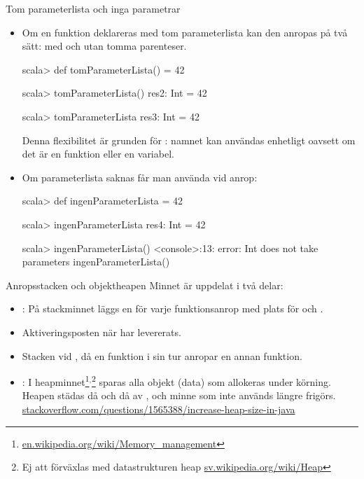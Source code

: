 \begin{Slide}{Tom parameterlista och inga parametrar}\SlideFontSmall
\begin{itemize}
\item Om en funktion deklareras med tom parameterlista \code{()} kan den anropas på två sätt: med och utan tomma parenteser.
\begin{REPL}
scala> def tomParameterLista() = 42

scala> tomParameterLista()
res2: Int = 42

scala> tomParameterLista
res3: Int = 42
\end{REPL}

Denna flexibilitet är grunden för : namnet kan användas enhetligt oavsett om det är en funktion eller en variabel.
\item Om parameterlista saknas får man  använda \code{()} vid anrop:

\begin{REPL}
scala> def ingenParameterLista = 42

scala> ingenParameterLista
res4: Int = 42

scala> ingenParameterLista()
<console>:13: error: Int does not take parameters
       ingenParameterLista()
\end{REPL}

\end{itemize}
\end{Slide}



\begin{Slide}{Anropsstacken och objektheapen}\SlideFontSmall
Minnet är uppdelat i två delar:
\begin{itemize}
\item {}: På stackminnet läggs en   för varje funktionsanrop med plats för  och .
\item Aktiveringsposten  när  har levererats.
\item Stacken  vid , då en funktion i sin tur anropar en annan funktion.

\item {}: I heapminnet\footnote{\href{https://en.wikipedia.org/wiki/Memory_management}{en.wikipedia.org/wiki/Memory\_management}}$^{,}$\footnote{Ej att förväxlas med datastrukturen heap  \href{https://sv.wikipedia.org/wiki/Heap}{sv.wikipedia.org/wiki/Heap}} sparas alla objekt (data) som allokeras under körning. Heapen städas då och då av  , och minne som inte används längre frigörs. \\\vspace{0.5em}
\href{http://stackoverflow.com/questions/1565388/increase-heap-size-in-java}{stackoverflow.com/questions/1565388/increase-heap-size-in-java}
\end{itemize}
\end{Slide}


